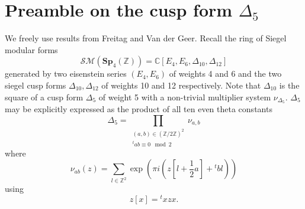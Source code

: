 \documentclass[9pt]{amsart} \usepackage[utf8]{inputenc}
\newcommand{\Z}{\mathbb{Z}} \newcommand{\C}{\mathbb{C}}
\newcommand{\Sp}{\mathbf{Sp}}
\begin{document}


%
%

\tableofcontents

\section{Preamble on the cusp form $\Delta_5$}

We freely use results from Freitag\cite{FREITAG:1} and Van der
Geer\cite{VDGEER:1}. Recall the ring of Siegel modular
forms $$\mathcal{SM}(\Sp_4(\Z)) = \C[E_4,E_6,\Delta_{10},\Delta_{12}]$$
generated by two eisenstein series $(E_4,E_6)$ of weights 4 and 6 and
the two siegel cusp forms $\Delta_{10},\Delta_{12}$ of weights 10 and 12
respectively. Note that $\Delta_{10}$ is the square of a cusp form
$\Delta_5$ of weight 5 with a non-trivial multiplier system $\nu_{\Delta_5}$.
$\Delta_5$ may be explicitly expressed as the product of all ten even theta
constants $$\Delta_5 = \displaystyle\prod_{\substack{(a,b)\in (\Z/2\Z)^2\\{}^t ab
\equiv 0 \mod 2}}\nu_{a,b}$$
where $$\nu_{ab}(z) =\displaystyle\sum_{l\in\Z^2} \exp(\pi i (z[l +
\frac{1}{2}a] + {}^tbl))$$ using $$z[x] = {}^tx z x.$$
\end{document}
